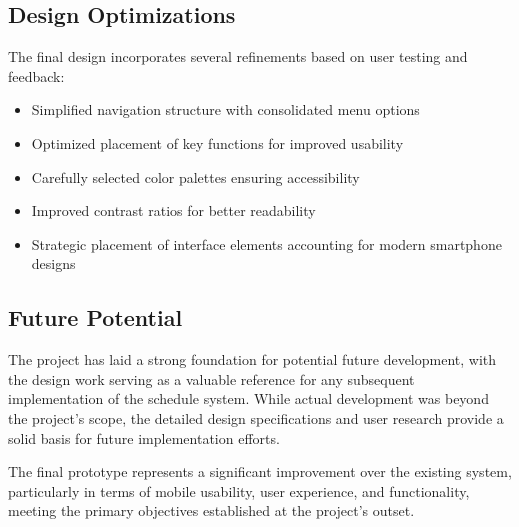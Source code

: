 \documentclass[sigconf,nonacm]{acmart}
\begin{document}
\subsection{Design Optimizations}

The final design incorporates several refinements based on user testing and feedback:

\begin{itemize}
    \item Simplified navigation structure with consolidated menu options
    \item Optimized placement of key functions for improved usability
    \item Carefully selected color palettes ensuring accessibility
    \item Improved contrast ratios for better readability
    \item Strategic placement of interface elements accounting for modern smartphone designs
\end{itemize}

\subsection{Future Potential}

The project has laid a strong foundation for potential future development, with the design work serving as a valuable reference for any subsequent implementation of the schedule system. While actual development was beyond the project's scope, the detailed design specifications and user research provide a solid basis for future implementation efforts.

The final prototype represents a significant improvement over the existing system, particularly in terms of mobile usability, user experience, and functionality, meeting the primary objectives established at the project's outset.


\end{document}
